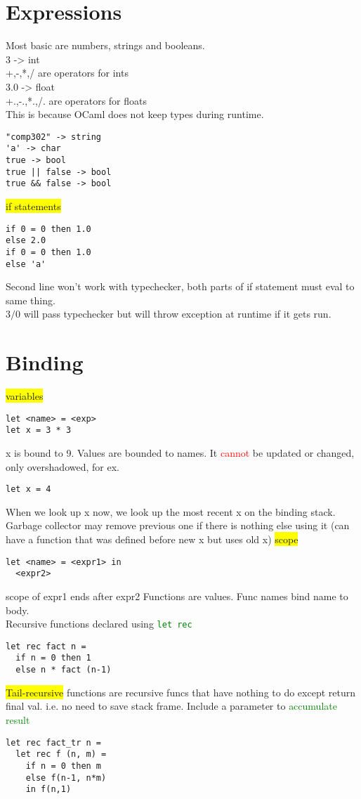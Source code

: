 \color{Sepia}
\section{Expressions}
Most basic are numbers, strings and booleans.
\\ 3 -> int
\\ +,-,*,/ are operators for ints
\\ 3.0 -> float
\\+.,-.,*.,/. are operators for floats
\\ This is because OCaml does not keep types during runtime.
\begin{lstlisting}
"comp302" -> string
'a' -> char
true -> bool
true || false -> bool
true && false -> bool
\end{lstlisting}
\colorbox{Yellow}{if statements}
\begin{lstlisting}
if 0 = 0 then 1.0
else 2.0
if 0 = 0 then 1.0
else 'a'
\end{lstlisting}
Second line won't work with typechecker, both parts of if statement
must eval to same thing.
\\ $3/0$ will pass typechecker but will throw exception at runtime if
it gets run.
\color{Blue}
\section{Binding}
\colorbox{Yellow}{variables}
\begin{lstlisting}
let <name> = <exp>
let x = 3 * 3
\end{lstlisting}
x is bound to 9. Values are bounded to names. It
\textcolor{red}{cannot} be updated or changed, only overshadowed, for
ex.
\begin{lstlisting}
let x = 4
\end{lstlisting}
When we look up x now, we look up the most recent x on the binding
stack. Garbage collector may remove previous one if there is nothing
else using it (can have a function that was defined before new x but
uses old x)
\colorbox{Yellow}{scope}
\begin{lstlisting}
let <name> = <expr1> in
  <expr2>
\end{lstlisting}
scope of expr1 ends after expr2
Functions are values. Func names bind name to body.
\\ Recursive functions declared using \textcolor{Green}{\texttt{let
    rec}}
\begin{lstlisting}
let rec fact n =
  if n = 0 then 1
  else n * fact (n-1)
\end{lstlisting}
\colorbox{Yellow}{Tail-recursive} functions are recursive funcs
that have nothing to do except return final val. i.e. no need to save
stack frame. Include a parameter to \textcolor{Green}{accumulate
  result}
\begin{lstlisting}
let rec fact_tr n =
  let rec f (n, m) = 
    if n = 0 then m
    else f(n-1, n*m)
    in f(n,1)
  \end{lstlisting}

